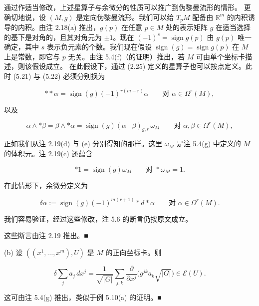 \begin{remark}

\begin{items}
\item

通过作适当修改，上述星算子与余微分的性质可以推广到伪黎曼流形的情形。
更确切地说，设 $ (M,g) $ 是定向伪黎曼流形。我们可以给 $ T_{p}M $ 配备由 $ \mathbb{R}^{m} $ 的内积诱导的内积。由注 2.18(a) 推出，$ g(p) $ 在任意 $ p \in M $ 处的表示矩阵 $ g $ 在适当选择的基下是对角的，且其对角元为 $ \pm 1 $。现在 $ (-1)^{s} = \operatorname{sign}g(p) $ 由 $ g(p) $ 唯一确定，其中 $ s $ 表示负元素的个数。我们现在假设 $ \operatorname{sign}(g) = \operatorname{sign}g(p) $ 在 $ M $ 上是常数，即它与 $ p $ 无关。由注 5.4(f)（的证明）推出，若 $ M $ 可由单个坐标卡描述，则该假设成立。
在此假设下，通过 (2.25) 定义的星算子也可以按点定义。此时 (5.21) 与 (5.22) 必须分别换为

\[
\ast\ast\alpha = \operatorname{sign}(g)(-1)^{r(m-r)}\alpha \qquad \text{对 } \alpha \in \Omega^{r}(M) ,
\]

以及

\[
\alpha \wedge \ast\beta = \beta \wedge \ast\alpha = \operatorname{sign}(g)(\alpha \mid \beta)_{g,r}\,\omega_{M} \qquad \text{对 } \alpha, \beta \in \Omega^{r}(M) ,
\]

正如我们从注 2.19(d) 与 (e) 分别得知的那样。这里 $ \omega_{M} $ 是注 5.4(g) 中定义的 $ M $ 的体积元。注 2.19(c) 还蕴含

\[
\ast 1 = \operatorname{sign}(g)\omega_{M} \qquad \text{对 } \ast\omega_{M} = 1 .
\]

在此情形下，余微分定义为

\begin{equation}
\delta\alpha := \operatorname{sign}(g)(-1)^{m(r+1)}\ast d\ast\alpha \qquad \text{对 } \alpha \in \Omega^{r}(M) .\tag{5.26}
\end{equation}

我们容易验证，经过这些修改，注 5.6 的断言仍按原文成立。

\proofhead
这些断言由注 2.19 推出。\nobreak\hspace{0.35em}■
\end{items}

(b) 设 $ ((x^{1},\ldots,x^{m}),U) $ 是 $ M $ 的正向坐标卡。则

\[
\delta\sum_{j}a_{j}\,dx^{j} = \frac{1}{\sqrt{|G|}}\sum_{j,k}\frac{\partial}{\partial x^{j}}\bigl(g^{jk}a_{k}\sqrt{|G|}\bigr) \in \mathcal{E}(U) .
\]

\proofhead
这可由注 5.4(g) 推出，类似于例 5.10(a) 的证明。\nobreak\hspace{0.35em}■
\end{remark}

